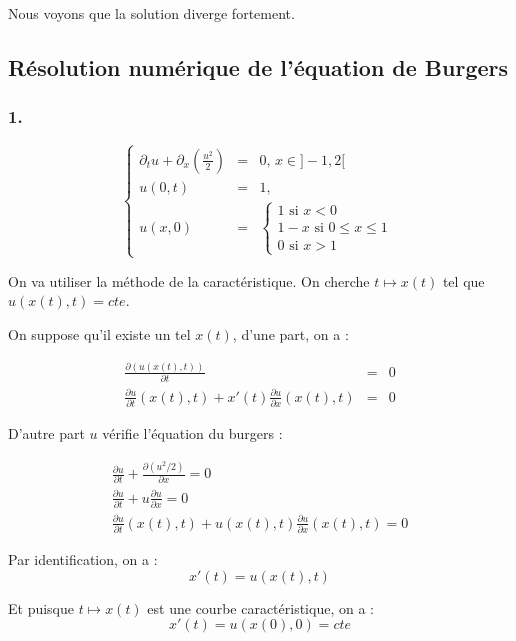 \documentclass{article}
\begin{document}
Nous voyons que la solution diverge fortement.

\subsection{Résolution numérique de l’équation de Burgers}

\subsubsection*{1. }

\[ \left\{ \begin{matrix}
	\partial_t u + \partial_x(\frac{u^2}{2}) &=& 0 \textbf{, } x \in ]-1,2[ \\
	u(0,t) &=& 1, \\
	u(x,0) &=& \left\{ \begin{matrix}
		1 \text{ si } x<0 \\
		1-x \text{ si } 0\leq x \leq 1 \\
		0 \text{ si } x>1	
	\end{matrix} \right.
\end{matrix} \right.
\label{eq3} \tag{Burgers1}
\]

On va utiliser la méthode de la caractéristique. On cherche $t \longmapsto x(t)$ tel que $u(x(t),t) = cte$.

On suppose qu'il existe un tel $x(t)$, d'une part, on a :

\begin{eqnarray*}
	\frac{\partial (u(x(t),t))}{\partial t} &=& 0 \\
	\frac{\partial u}{\partial t}(x(t),t) + x'(t) \frac{\partial u}{\partial x}(x(t),t) &=& 0
\end{eqnarray*}

D'autre part $u$ vérifie l'équation du burgers :

\begin{eqnarray*}
	\frac{\partial u}{\partial t} + \frac{\partial (u^2/2)}{\partial x} = 0 \\
	\frac{\partial u}{\partial t} + u \frac{\partial u}{\partial x} = 0 \\
	\frac{\partial u}{\partial t}(x(t),t) + u(x(t),t) \frac{\partial u}{\partial x}(x(t),t) = 0 
\end{eqnarray*}

Par identification, on a :
\[ x'(t) = u(x(t),t) \]

Et puisque $t \longmapsto x(t)$ est une courbe caractéristique, on a :
\[x'(t) = u(x(0),0) = cte\]
\end{document}
